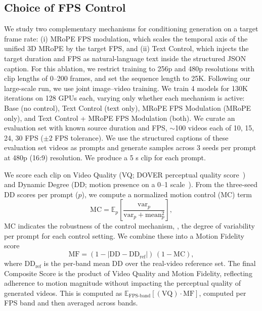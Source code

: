 \subsection{Choice of FPS Control}

We study two complementary mechanisms for conditioning generation on a target frame rate: (i) MRoPE FPS modulation, which scales the temporal axis of the unified 3D MRoPE by the target FPS, and (ii) Text Control, which injects the target duration and FPS as natural-language text inside the structured JSON caption. For this ablation, we
restrict training to 256p and 480p resolutions with clip lengths of 0–200 frames, and set the sequence length
to 25K. Following our large-scale run, we use joint image–video training. We train 4 models for 130K iterations on 128 GPUs each, varying only whether each mechanism is active: Base (no control), Text Control (text only), MRoPE FPS Modulation (MRoPE only), and Text Control + MRoPE FPS Modulation (both). We curate an evaluation set with known source duration and FPS, $\sim$100 videos each of 10, 15, 24, 30 FPS ($\pm$2 FPS tolerance). We use the structured captions of these evaluation set videos as prompts and generate samples across 3 seeds per prompt at 480p (16:9) resolution. We produce a 5 s clip for each prompt.

We score each clip on Video Quality (VQ; DOVER perceptual quality score~\citep{dover}) and Dynamic Degree (DD; motion presence on a 0--1 scale~\citep{huang2023vbench}). From the three-seed DD scores per prompt ($p$), we compute a normalized motion control (MC) term
\begin{equation}
    \text{MC} = \mathbb{E}_{p}\!\left[\frac{\text{var}_p}{\text{var}_p + \text{mean}_p^2}\right],
\end{equation}
MC indicates the robustness of the control mechanism, \ie, the degree of variability per prompt for each control setting. We combine these into a Motion Fidelity score
\begin{equation}
    \text{MF} = (1 - |\text{DD} - \text{DD}_{\text{ref}}|)\,(1 - \text{MC}),
\end{equation}
where $\text{DD}_{\text{ref}}$ is the per-band mean DD over the real-video reference set. The final Composite Score is the product of Video Quality and Motion Fidelity, reflecting adherence to motion magnitude without impacting the perceptual quality of generated videos. This is computed as $\mathbb{E}_{\text{FPS-band}}\!\left[(\text{VQ}) \cdot \text{MF}\right]$, computed per FPS band and then averaged across bands.

